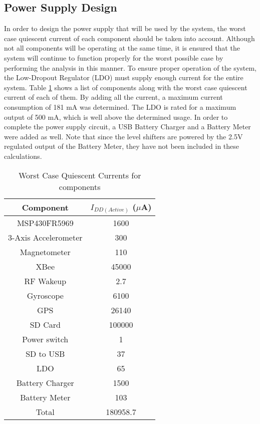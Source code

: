 \subsection{Power Supply Design}
In order to design the power supply that will be used by the system, the worst case quiescent current of each component should be taken into account.  Although not all components will be operating at the same time, it is ensured that the system will continue to function properly for the worst possible case by performing the analysis in this manner.  To ensure proper operation of the system, the Low-Dropout Regulator (LDO) must supply enough current for the entire system.  Table \ref{tab:powerSupply} shows a list of components along with the worst case quiescent current of each of them.  By adding all the current, a maximum current consumption of 181 mA was determined.  The LDO is rated for a maximum output of 500 mA, which is well above the determined usage.  In order to complete the power supply circuit, a USB Battery Charger and a Battery Meter were added as well. Note that since the level shifters are powered by the 2.5V regulated output of the Battery Meter, they have not been included in these calculations.
\begin{table}[H]
  \centering
  \caption{Worst Case Quiescent Currents for components}
    \begin{tabular}{|c|c|}
     \hline
     \rowcolor{Gray}
    Component & $I_{DD(Active)}$ ($\mu$A) \\
     \hline \hline
    MSP430FR5969 & 1600   \\ \hline
    3-Axis Accelerometer & 300  \\ \hline
    Magnetometer & 110  \\ \hline
    XBee  & 45000 \\ \hline
    RF Wakeup & 2.7   \\ \hline
    Gyroscope & 6100  \\ \hline
    GPS   & 26140 \\ \hline
    SD Card & 100000  \\ \hline
    Power switch & 1  \\ \hline
    SD to USB & 37   \\ \hline
    LDO   & 65  \\ \hline
    Battery Charger & 1500  \\ \hline
    Battery Meter & 103   \\ \hline \hline
    Total & 180958.7  \\ \hline     
    \end{tabular}%
  \label{tab:powerSupply}%
\end{table}%

